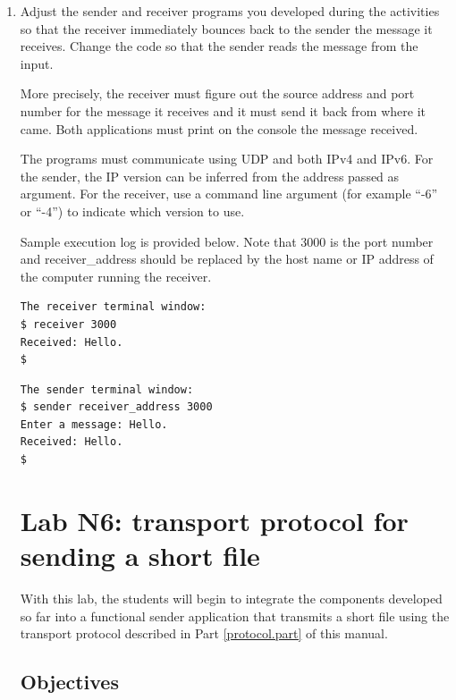 \documentclass[12pt]{book}
\begin{document}
\begin{enumerate}[label=\arabic*.]
\item Adjust the sender and receiver programs you developed during the activities so that the receiver immediately bounces back to the sender the message it receives. Change the code so that the sender reads the message from the input.

  More precisely, the receiver must figure out the source address and port number for the message it receives and it must send it back from where it came. Both applications must print on the console the message received.

  The programs must communicate using UDP and both IPv4 and IPv6. For the sender, the IP version can be inferred from the address passed as argument. For the receiver, use a command line argument (for example ``-6'' or ``-4'') to indicate which version to use.

  Sample execution log is provided below. Note that 3000 is the port number and receiver\_address should be replaced by the host name or IP address of the computer running the receiver.

\begin{verbatim}
The receiver terminal window:
$ receiver 3000
Received: Hello.
$
\end{verbatim}

\begin{verbatim}
The sender terminal window:
$ sender receiver_address 3000
Enter a message: Hello.
Received: Hello.
$
\end{verbatim}



\chapter{Lab N6: transport protocol for sending a short file}

With this lab, the students will begin to integrate the components developed so far into a functional sender application that transmits a short file using the transport protocol described in Part \ref{protocol.part} of this manual. 

\section{Objectives}


\end{enumerate}
\end{document}

